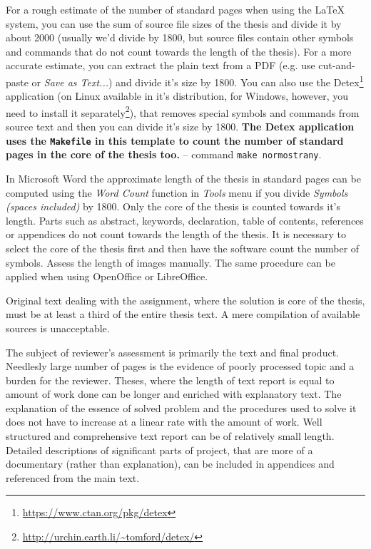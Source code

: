 {{For a rough estimate of the number of standard pages when using the \LaTeX{} system, you can use the sum of source file sizes of the thesis and divide it by about 2000 (usually we'd divide by 1800, but source files contain other symbols and commands that do not count towards the length of the thesis). For a more accurate estimate, you can extract the plain text from a PDF (e.g. use cut-and-paste or {\it Save as Text...}) and divide it's size by 1800. You can also use the Detex\footnote{\url{https://www.ctan.org/pkg/detex}} application (on Linux available in it's distribution, for Windows, however, you need to install it separately\footnote{\url{http://urchin.earth.li/~tomford/detex/}}), that removes special symbols and commands from source text and then you can divide it's size by 1800. \textbf{The Detex application uses the \texttt{Makefile} in this template to count the number of standard pages in the core of the thesis too.} -- command \verb|make normostrany|.

In Microsoft Word the approximate length of the thesis in standard pages can be computed using the {\it Word Count} function in {\it Tools} menu if you divide {\it Symbols (spaces included)} by 1800. Only the core of the thesis is counted towards it's length. Parts such as abstract, keywords, declaration, table of contents, references or appendices do not count towards the length of the thesis. It is necessary to select the core of the thesis first and then have the software count the number of symbols. Assess the length of images manually. The same procedure can be applied when using OpenOffice or LibreOffice.

Original text dealing with the assignment, where the solution is core of the thesis, must be at least a third of the entire thesis text. A mere compilation of available sources is unacceptable.

The subject of reviewer's assessment is primarily the text and final product.
Needlesly large number of pages is the evidence of poorly processed topic and a burden for the reviewer. Theses, where the length of text report is equal to amount of work done can be longer and enriched with explanatory text. The explanation of the essence of solved problem and the procedures used to solve it does not have to increase at a linear rate with the amount of work. Well structured and comprehensive text report can be of relatively small length. Detailed descriptions of significant parts of project, that are more of a documentary (rather than explanation), can be included in appendices and referenced from the main text.

}}
